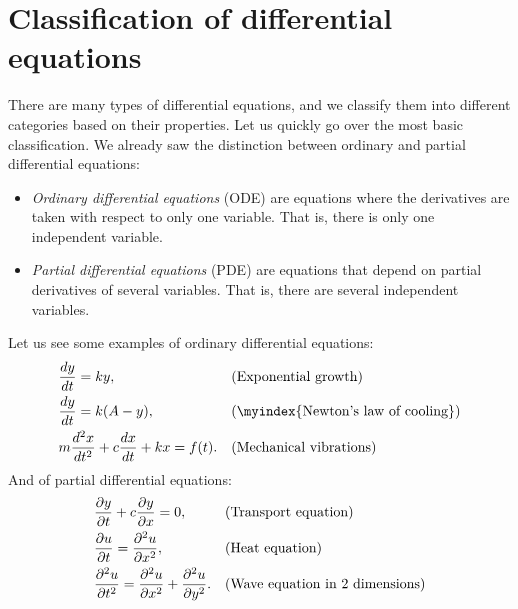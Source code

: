 
\sectionnewpage
\section{Classification of differential equations}
\label{classification:section}


There are many types of differential equations, and we classify them into
different categories based on their properties.  Let us quickly go over
the most basic classification.  We already saw the distinction
between ordinary and partial differential equations:
\begin{itemize}
\item
\emph{Ordinary differential equations}
 (ODE) are
equations where the derivatives are taken with respect to only one variable.
That is, there is only one independent variable.
\item
\emph{Partial differential equations}
 (PDE) are
equations that depend on partial derivatives of several variables.
That is, there are several independent variables.
\end{itemize}

Let us see some examples of ordinary differential equations:
\begin{align*}
& \frac{d y}{dt} = ky , & & \text{(Exponential growth\index{exponential growth})} \\
& \frac{d y}{dt} = k(A-y) , & & \text{(\myindex{Newton's law of cooling})} \\
& m \frac{d^2 x}{dt^2} + c \frac{dx}{dt} + kx = f(t) . & &
\text{(Mechanical vibrations\index{mechanical vibrations})}
\end{align*}
And of partial differential equations:
\begin{align*}
& \frac{\partial y}{\partial t} + c \frac{\partial y}{\partial x} = 0 , & & 
\text{(Transport equation\index{transport equation})} \\
& \frac{\partial u}{\partial t} = \frac{\partial^2 u}{\partial x^2} , & & 
\text{(Heat equation\index{heat equation})} \\
& \frac{\partial^2 u}{\partial t^2} = \frac{\partial^2 u}{\partial x^2} +
\frac{\partial^2 u}{\partial y^2} . & & 
\text{(Wave equation in 2 dimensions\index{wave equation in 2 dimensions})}
\end{align*}

